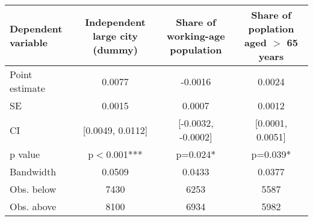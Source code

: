 \begin{tabular}{lccc}
  \toprule
 \midrule
Dependent variable & Independent large city (dummy) & Share of working-age population & Share of poplation aged $>$ 65 years \\ 
  \midrule
Point estimate &   0.0077 &  -0.0016 &   0.0024 \\ 
  SE &  0.0015 &  0.0007 &  0.0012 \\ 
  CI & [0.0049, 0.0112] & [-0.0032, -0.0002] & [0.0001, 0.0051] \\ 
  p value & p$<$0.001*** & p=0.024* & p=0.039* \\ 
   \midrule
Bandwidth & 0.0509 & 0.0433 & 0.0377 \\ 
  Obs. below &  7430 &  6253 &  5587 \\ 
  Obs. above &  8100 &  6934 &  5982 \\ 
   \midrule
 \bottomrule
\end{tabular}
